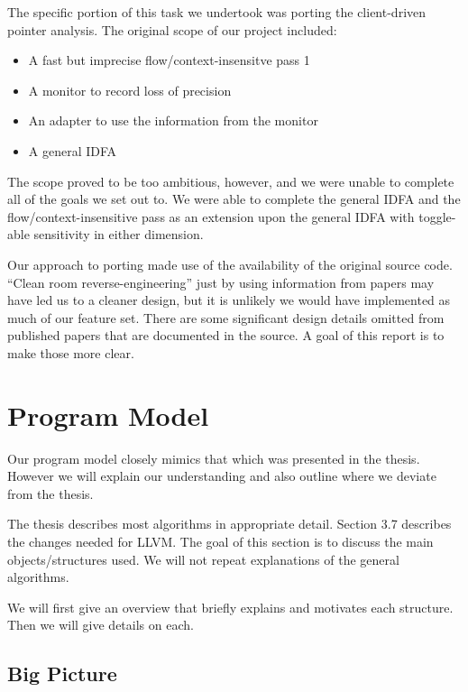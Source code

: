 The specific portion of this task we undertook was porting the client-driven
pointer analysis. The original scope of our project included:

\begin{itemize}
\item A fast but imprecise flow/context-insensitve pass 1 
\item A monitor to record loss of precision 
\item An adapter to use the information from the monitor 
\item A general IDFA
\end{itemize}

The scope proved to be too ambitious, however, and we were unable to complete
all of the goals we set out to. We were able to complete the general IDFA and
the flow/context-insensitive pass as an extension upon the general IDFA with
toggle-able sensitivity in either dimension.

Our approach to porting made use of the availability of the original source code.
``Clean room reverse-engineering'' just by using information from papers may have
led us to a cleaner design, but it is unlikely we would have implemented as much
of our feature set. There are some significant design details omitted from
published papers that are documented in the source. A goal of this report is to
make those more clear.


\section{Program Model}

Our program model closely mimics that which was presented in the thesis. However
we will explain our understanding and also outline where we deviate from the
thesis.

The thesis \cite{guyer} describes most algorithms in appropriate detail. Section
3.7 describes the changes needed for LLVM. The goal of this section is to
discuss the main objects/structures used.  We will not repeat explanations of
the general algorithms.

We will first give an overview that briefly explains and motivates each
structure. Then we will give details on each.

\subsection{Big Picture}

